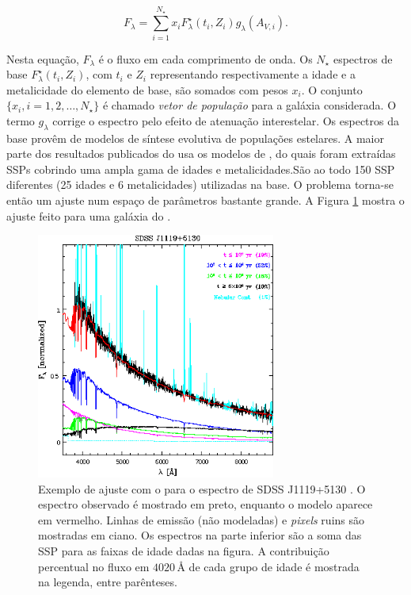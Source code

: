 \begin{equation*}
F_\lambda = \sum_{i=1}^{N_\star} x_i F^\star_\lambda(t_i,Z_i)
g_\lambda(A_{V,i}).
\end{equation*}

Nesta equação, $F_\lambda$ é o fluxo em cada comprimento de onda. Os $N_\star$
espectros de base $F^\star_\lambda(t_i, Z_i)$, com $t_i$ e $Z_i$ representando
respectivamente a idade e a metalicidade do elemento de base, são somados com
pesos $x_i$. O conjunto $\{x_i, i=1,2,\ldots,N_\star\}$ é chamado {\em vetor de
população} para a galáxia considerada. O termo $g_\lambda$ corrige o espectro
pelo efeito de atenuação interestelar. Os espectros da base provêm de modelos de
síntese evolutiva de populações estelares. A maior parte dos resultados
publicados do \starlight usa os modelos de \citet[BC03]{Bruzual2003}, do quais
foram extraídas SSPs cobrindo uma ampla gama de idades e metalicidades.São ao
todo 150 SSP diferentes (25 idades e 6 metalicidades) utilizadas na base. O
problema torna-se então um ajuste num espaço de parâmetros bastante grande. A
Figura \ref{fig:StarlightSpectrumSample} mostra o ajuste feito para uma galáxia
do \SDSS.

\begin{figure}
	\includegraphics[width=0.7\textwidth]{figuras/starlight-fit.eps}
	\caption[Exemplo de ajuste de espectro com o \starlight.]
	{Exemplo de ajuste com o \starlight para o espectro de SDSS J1119+5130
	\citep[figura 2]{CidFernandes2006}. O espectro observado é mostrado em preto,
	enquanto o modelo aparece em vermelho. Linhas de emissão (não modeladas) e {\em
	pixels} ruins são mostradas em ciano. Os espectros na parte inferior são a soma
	das SSP para as faixas de idade dadas na figura. A contribuição percentual no
	fluxo em $4020\,\textrm{\AA}$ de cada grupo de idade é mostrada na legenda,
	entre parênteses.}
	\label{fig:StarlightSpectrumSample}
\end{figure}

